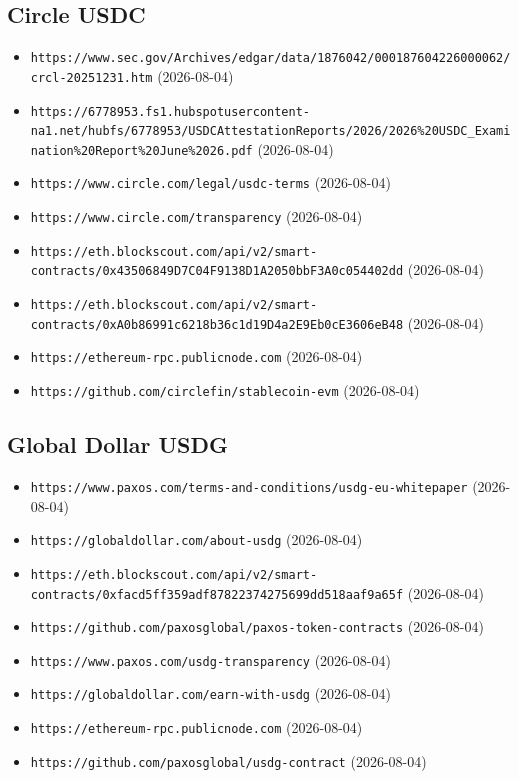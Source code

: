 \subsection*{Circle USDC}
\begin{itemize}\setlength{\itemsep}{0pt}\small
\item \texttt{https://www.sec.gov/Archives/edgar/data/1876042/000187604226000062/crcl-20251231.htm} (2026-08-04)
\item \texttt{https://6778953.fs1.hubspotusercontent-na1.net/hubfs/6778953/USDCAttestationReports/2026/2026\%20USDC\_Examination\%20Report\%20June\%2026.pdf} (2026-08-04)
\item \texttt{https://www.circle.com/legal/usdc-terms} (2026-08-04)
\item \texttt{https://www.circle.com/transparency} (2026-08-04)
\item \texttt{https://eth.blockscout.com/api/v2/smart-contracts/0x43506849D7C04F9138D1A2050bbF3A0c054402dd} (2026-08-04)
\item \texttt{https://eth.blockscout.com/api/v2/smart-contracts/0xA0b86991c6218b36c1d19D4a2E9Eb0cE3606eB48} (2026-08-04)
\item \texttt{https://ethereum-rpc.publicnode.com} (2026-08-04)
\item \texttt{https://github.com/circlefin/stablecoin-evm} (2026-08-04)
\end{itemize}

\subsection*{Global Dollar USDG}
\begin{itemize}\setlength{\itemsep}{0pt}\small
\item \texttt{https://www.paxos.com/terms-and-conditions/usdg-eu-whitepaper} (2026-08-04)
\item \texttt{https://globaldollar.com/about-usdg} (2026-08-04)
\item \texttt{https://eth.blockscout.com/api/v2/smart-contracts/0xfacd5ff359adf87822374275699dd518aaf9a65f} (2026-08-04)
\item \texttt{https://github.com/paxosglobal/paxos-token-contracts} (2026-08-04)
\item \texttt{https://www.paxos.com/usdg-transparency} (2026-08-04)
\item \texttt{https://globaldollar.com/earn-with-usdg} (2026-08-04)
\item \texttt{https://ethereum-rpc.publicnode.com} (2026-08-04)
\item \texttt{https://github.com/paxosglobal/usdg-contract} (2026-08-04)
\end{itemize}

